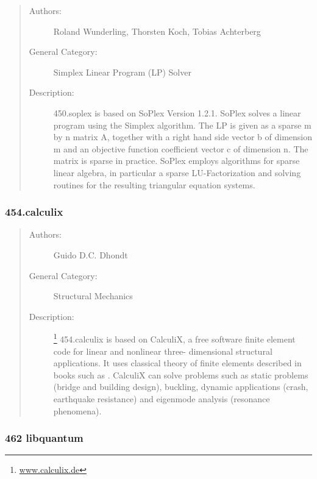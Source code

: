 \documentclass[onecolumn, openright, master, english, signatures]{dbrgrptt}
\begin{document}
\begin{quote}
\begin{description}
\item[Authors:] Roland Wunderling, Thorsten Koch, Tobias Achterberg

\item[General Category:] Simplex Linear Program (LP) Solver

\item[Description:] 450.soplex is based on SoPlex Version 1.2.1. SoPlex solves a linear program using the Simplex algorithm. The LP is given as a sparse m by n matrix A, together with a right hand side vector b of dimension m and an objective function coefficient vector c of dimension n. The matrix is sparse in practice. SoPlex employs algorithms for sparse linear algebra, in particular a sparse LU-Factorization and solving routines for the resulting triangular equation systems.
\end{description}
\end{quote}

\subsubsection{454.calculix}

\begin{quote}
\begin{description}
\item[Authors:] Guido D.C. Dhondt

\item[General Category:] Structural Mechanics

\item[Description:]\footnote{\url{www.calculix.de}} 454.calculix is based on CalculiX, a free software finite element code for linear and nonlinear three- dimensional structural applications. It uses classical theory of finite elements described in books such as \cite{zienkiewicz1977finite}. CalculiX can solve problems such as static problems (bridge and building design), buckling, dynamic applications (crash, earthquake resistance) and eigenmode analysis (resonance phenomena).
\end{description}
\end{quote}

\subsubsection{462 libquantum}
\end{document}

